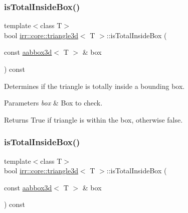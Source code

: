 \subsubsection{\texorpdfstring{is\+Total\+Inside\+Box()}{isTotalInsideBox()}\hspace{0.1cm}{\footnotesize\ttfamily [1/2]}}
{\footnotesize\ttfamily template$<$class T$>$ \\
bool \hyperlink{classirr_1_1core_1_1triangle3d}{irr\+::core\+::triangle3d}$<$ T $>$\+::is\+Total\+Inside\+Box (\begin{DoxyParamCaption}\item[{const \hyperlink{classirr_1_1core_1_1aabbox3d}{aabbox3d}$<$ T $>$ \&}]{box }\end{DoxyParamCaption}) const\hspace{0.3cm}{\ttfamily [inline]}}



Determines if the triangle is totally inside a bounding box. 


\begin{DoxyParams}{Parameters}
{\em box} & Box to check. \\
\hline
\end{DoxyParams}
\begin{DoxyReturn}{Returns}
True if triangle is within the box, otherwise false. 
\end{DoxyReturn}
\mbox{\label{classirr_1_1core_1_1triangle3d_a9baf7f6b0d49b8046f434cf0829eb8fd}} 
\subsubsection{\texorpdfstring{is\+Total\+Inside\+Box()}{isTotalInsideBox()}\hspace{0.1cm}{\footnotesize\ttfamily [2/2]}}
{\footnotesize\ttfamily template$<$class T$>$ \\
bool \hyperlink{classirr_1_1core_1_1triangle3d}{irr\+::core\+::triangle3d}$<$ T $>$\+::is\+Total\+Inside\+Box (\begin{DoxyParamCaption}\item[{const \hyperlink{classirr_1_1core_1_1aabbox3d}{aabbox3d}$<$ T $>$ \&}]{box }\end{DoxyParamCaption}) const\hspace{0.3cm}{\ttfamily [inline]}}



